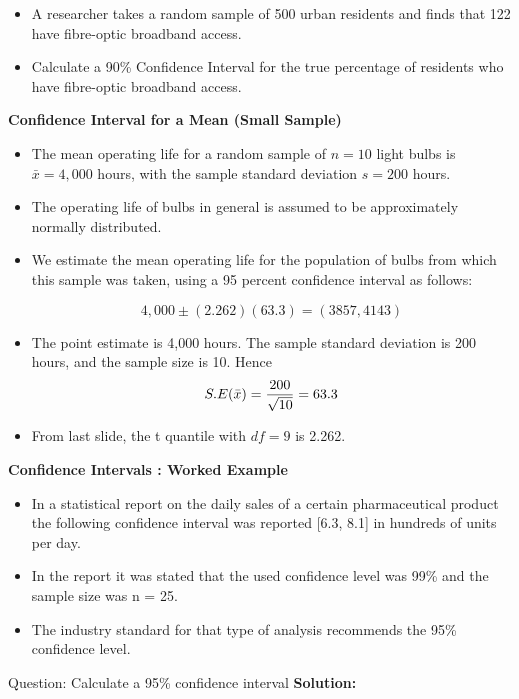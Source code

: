 \item 


\begin{itemize}
\item A researcher takes a random sample of 500 urban residents and finds that
122 have fibre-optic broadband access. 
\item Calculate a 90\% Confidence Interval for
the true percentage of residents who have fibre-optic broadband access.
\end{itemize}


\item \textbf{Confidence Interval for a Mean (Small Sample)} \\
\begin{itemize}
\item The mean operating life for a random sample of $n = 10$ light bulbs is $\bar{x} = 4,000$ hours, with the sample
standard deviation $s = 200$ hours. 

\item The operating life of bulbs in general is assumed to be approximately normally distributed.
\item We estimate the mean operating life for the population of bulbs from which this sample was taken, using a 95 percent confidence interval as follows:

\[4,000\pm(2.262)(63.3)  = (3857,4143)\]

\item The point estimate is 4,000 hours. The sample standard deviation is 200 hours, and the sample size is 10. Hence
\[S.E(\bar{x} ) = { 200 \over \sqrt{10}} = 63.3\]

\item From last slide, the t quantile with $df=9$ is 2.262.
\end{itemize}

\item \textbf{Confidence Intervals : Worked Example}\\

\begin{itemize} 
\item In a statistical report on the daily sales of a certain pharmaceutical product the following confidence interval was reported [6.3, 8.1] in hundreds of units per day.

\item In the report it was stated that the used confidence level was 99\% and the sample size was n = 25. 
\item The industry standard for that type of analysis recommends the 95\% confidence level.
\end{itemize}
Question: Calculate a 95\% confidence interval
\textbf{Solution:}

